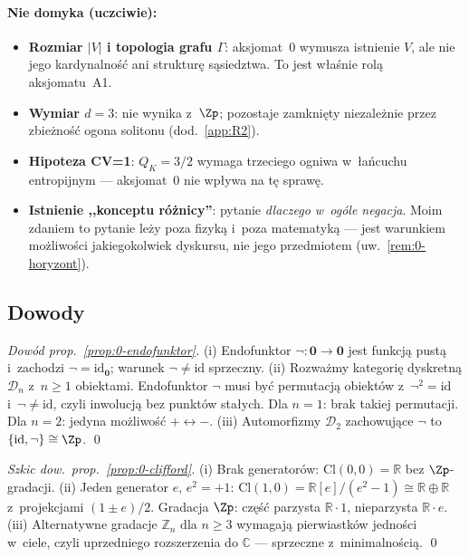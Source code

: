 \paragraph{Nie domyka (uczciwie):}
\begin{itemize}[nosep]
  \item \textbf{Rozmiar $|V|$ i topologia grafu $\Gamma$}: aksjomat~0
    wymusza istnienie $V$, ale nie jego kardynalno\'s\'c ani struktur\k{e}
    s\k{a}siedztwa. To jest w\l{}a\'snie rol\k{a} aksjomatu~A1.
  \item \textbf{Wymiar $d=3$}: nie wynika z~$\Zp$; pozostaje zamkni\k{e}ty
    niezale\.znie przez zbie\.zno\'s\'c ogona solitonu (dod.~\ref{app:R2}).
  \item \textbf{Hipoteza CV=1}: $Q_K = 3/2$ wymaga trzeciego ogniwa
    w~\l{}a\'ncuchu entropijnym --- aksjomat~0 nie wp\l{}ywa na t\k{e}
    spraw\k{e}.
  \item \textbf{Istnienie ,,konceptu r\'o\.znicy''}: pytanie
    \emph{dlaczego w~og\'ole negacja}. Moim zdaniem to pytanie le\.zy
    poza fizyk\k{a} i~poza matematyk\k{a} --- jest warunkiem
    mo\.zliwości jakiegokolwiek dyskursu, nie jego przedmiotem
    (uw.~\ref{rem:0-horyzont}).
\end{itemize}

\subsection{Dowody}%
\label{app:0-dowody}

\begin{proof}[Dow\'od prop.~\ref{prop:0-endofunktor}]
(i) Endofunktor $\neg: \mathbf{0} \to \mathbf{0}$ jest funkcj\k{a}
pust\k{a} i~zachodzi $\neg = \mathrm{id}_{\mathbf{0}}$; warunek
$\neg \neq \mathrm{id}$ sprzeczny. (ii) Rozwa\.zmy kategori\k{e}
dyskretn\k{a} $\mathcal{D}_n$ z~$n \geq 1$ obiektami. Endofunktor
$\neg$ musi by\'c permutacj\k{a} obiekt\'ow z~$\neg^2 = \mathrm{id}$
i~$\neg \neq \mathrm{id}$, czyli inwolucj\k{a} bez punkt\'ow
sta\l{}ych. Dla $n=1$: brak takiej permutacji. Dla $n=2$: jedyna
mo\.zliwo\'s\'c $+ \leftrightarrow -$. (iii) Automorfizmy
$\mathcal{D}_2$ zachowuj\k{a}ce $\neg$ to $\{\mathrm{id}, \neg\}
\cong \Zp$. \qed
\end{proof}

\begin{proof}[Szkic dow.~prop.~\ref{prop:0-clifford}]
(i) Brak generator\'ow: $\mathrm{Cl}(0,0) = \mathbb{R}$ bez $\Zp$-gradacji.
(ii) Jeden generator $e$, $e^2 = +1$: $\mathrm{Cl}(1,0) = \mathbb{R}[e]/(e^2-1)
\cong \mathbb{R} \oplus \mathbb{R}$ z~projekcjami $(1 \pm e)/2$.
Gradacja $\Zp$: cz\k{e}\'s\'c parzysta $\mathbb{R}\cdot 1$, nieparzysta
$\mathbb{R}\cdot e$. (iii) Alternatywne gradacje $\mathbb{Z}_n$ dla
$n \geq 3$ wymagaj\k{a} pierwiastk\'ow jedno\'sci w~ciele, czyli
uprzedniego rozszerzenia do $\mathbb{C}$ --- sprzeczne z~minimalno\'sci\k{a}.
\qed
\end{proof}

